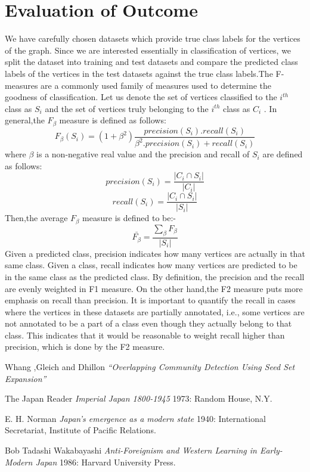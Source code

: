 \documentclass{article}
\begin{document}
\section*{Evaluation of Outcome}
We have carefully chosen datasets which provide true class labels for the vertices of the graph. Since we are interested essentially in classification of vertices, we split the dataset into training and test datasets and compare the predicted class labels of the vertices in the test datasets against the true class labels.The F-measures are a commonly used family of measures used to determine the goodness of classification. Let us denote the set of vertices classified to the $i^{th}$ class as $S_i$ and the set of vertices truly belonging to the $i^{th}$ class as $C_i$ . In general,the $F_{\beta}$ measure is defined as follows:
\begin{equation}
F_{\beta}(S_{i}) = (1+{\beta^2}) \frac{precision(S_{i}).recall(S_{i})}{{\beta^2}.precision(S_{i})+recall(S_{i})}
\end{equation}
where $\beta$ is a non-negative real value and the precision and recall of $S_i$ are defined as follows:
\begin{equation}
precision({S_{i}}) = \frac{ \left|{{C_{i}} \cap {S_{i}}}\right| }{ \left|{C_{i}}\right| } 
\end{equation} 
\begin{equation}
recall({S_{i}}) = \frac{ \left|{{C_{i}} \cap {S_{i}}}\right| }{ \left| {S_{i}} \right| } 
\end{equation} 
Then,the average $F_{\beta}$ measure is defined to be:-
\begin{equation}
\bar{F_{\beta}} = \frac{\sum_{\beta}{F_{\beta}}}{ \left|{S_{i}}\right| }
\end{equation}
Given a predicted class, precision indicates how many vertices are actually in that same class. Given a class, recall indicates how many vertices are predicted to be in the same class as the predicted class. By definition, the precision and the recall are evenly weighted in F1 measure. On the other hand,the F2 measure puts more emphasis on recall than precision. It is important to quantify the recall in cases where the vertices in these datasets are partially annotated, i.e., some vertices are not annotated to be a part of a class even though they actually belong to that class. This indicates that it would be reasonable to weight recall higher than precision, which is done by the F2 measure.

\begin{thebibliography}{1}
 Whang ,Gleich and Dhillon {\em ``Overlapping Community Detection
Using Seed Set Expansion''} 

  The Japan Reader {\em Imperial Japan 1800-1945} 1973:
  Random House, N.Y.

 E. H. Norman {\em Japan's emergence as a modern
  state} 1940: International Secretariat, Institute of Pacific
  Relations.

 Bob Tadashi Wakabayashi {\em Anti-Foreignism and Western
  Learning in Early-Modern Japan} 1986: Harvard University Press.
\end{thebibliography}
\end{document}
